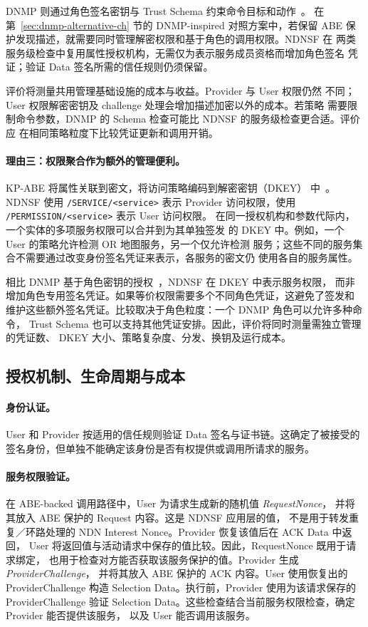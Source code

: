 DNMP 则通过角色签名密钥与 Trust Schema 约束命令目标和动作~\cite{dnmp}。
在第~\ref{sec:dnmp-alternative-ch} 节的 DNMP-inspired 对照方案中，若保留
ABE 保护发现描述，就需要同时管理解密权限和基于角色的调用权限。NDNSF 在
两类服务级检查中复用属性授权机构，无需仅为表示服务成员资格而增加角色签名
凭证；验证 Data 签名所需的信任规则仍须保留。

评价将测量共用管理基础设施的成本与收益。Provider 与 User 权限仍然
不同；User 权限解密密钥及 challenge 处理会增加描述加密以外的成本。若策略
需要限制命令参数，DNMP 的 Schema 检查可能比 NDNSF 的服务级检查更合适。评价应
在相同策略粒度下比较凭证更新和调用开销。

\paragraph{理由三：权限聚合作为额外的管理便利。}
KP-ABE 将属性关联到密文，将访问策略编码到解密密钥（DKEY）
中~\cite{goyal2006abe,dulal2023nacabe}。NDNSF 使用 \texttt{/SERVICE/<service>} 表示
Provider 访问权限，使用 \texttt{/PERMISSION/<service>} 表示 User 访问权限。
在同一授权机构和参数代际内，一个实体的多项服务权限可以合并到为其单独签发
的 DKEY 中。例如，一个 User 的策略允许检测 OR 地图服务，另一个仅允许检测
服务；这些不同的服务集合不需要通过改变身份签名凭证来表示，各服务的密文仍
使用各自的服务属性。

相比 DNMP 基于角色密钥的授权~\cite{dnmp}，NDNSF 在 DKEY 中表示服务权限，
而非增加角色专用签名凭证。如果等价权限需要多个不同角色凭证，这避免了签发和
维护这些额外签名凭证。比较取决于角色粒度：一个 DNMP 角色可以允许多种命令，
Trust Schema 也可以支持其他凭证安排。因此，评价将同时测量需独立管理的凭证数、
DKEY 大小、策略复杂度、分发、换钥及运行成本。

\subsection{授权机制、生命周期与成本}
\label{sec:authorization-withdrawal-ch}

\paragraph{身份认证。}
User 和 Provider 按适用的信任规则验证 Data 签名与证书链。这确定了被接受的
签名身份，但单独不能确定该身份是否有权提供或调用所请求的服务。

\paragraph{服务权限验证。}
在 ABE-backed 调用路径中，User 为请求生成新的随机值 \emph{RequestNonce}，
并将其放入 ABE 保护的 Request 内容。这是 NDNSF 应用层的值，
不是用于转发重复／环路处理的 NDN Interest Nonce。Provider 恢复该值后在 ACK Data 中返回，
User 将返回值与活动请求中保存的值比较。因此，RequestNonce 既用于请求绑定，
也用于检查对方能否获取该服务保护的值。Provider 生成 \emph{ProviderChallenge}，
并将其放入 ABE 保护的 ACK 内容。User 使用恢复出的 ProviderChallenge 构造
Selection Data。执行前，Provider 使用为该请求保存的 ProviderChallenge 验证
Selection Data。这些检查结合当前服务权限检查，确定 Provider 能否提供该服务，
以及 User 能否调用该服务。

